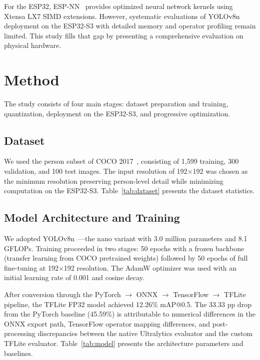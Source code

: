 \documentclass[10pt,twocolumn]{article}
\begin{document}
For the ESP32, ESP-NN~\cite{espnn} provides optimized neural network kernels using Xtensa LX7 SIMD extensions. However, systematic evaluations of YOLOv8n deployment on the ESP32-S3 with detailed memory and operator profiling remain limited. This study fills that gap by presenting a comprehensive evaluation on physical hardware.

\section{Method}
\label{sec:method}

The study consists of four main stages: dataset preparation and training, quantization, deployment on the ESP32-S3, and progressive optimization.

\subsection{Dataset}

We used the person subset of COCO 2017~\cite{coco}, consisting of 1,599 training, 300 validation, and 100 test images. The input resolution of 192$\times$192 was chosen as the minimum resolution preserving person-level detail while minimizing computation on the ESP32-S3. Table~\ref{tab:dataset} presents the dataset statistics.



\subsection{Model Architecture and Training}

We adopted YOLOv8n~\cite{ultralytics}---the nano variant with 3.0 million parameters and 8.1 GFLOPs. Training proceeded in two stages: 50 epochs with a frozen backbone (transfer learning from COCO pretrained weights) followed by 50 epochs of full fine-tuning at 192$\times$192 resolution. The AdamW optimizer was used with an initial learning rate of 0.001 and cosine decay.

After conversion through the PyTorch $\rightarrow$ ONNX $\rightarrow$ TensorFlow $\rightarrow$ TFLite pipeline, the TFLite FP32 model achieved 12.26\% mAP@0.5. The 33.33 pp drop from the PyTorch baseline (45.59\%) is attributable to numerical differences in the ONNX export path, TensorFlow operator mapping differences, and post-processing discrepancies between the native Ultralytics evaluator and the custom TFLite evaluator. Table~\ref{tab:model} presents the architecture parameters and baselines.
\end{document}
